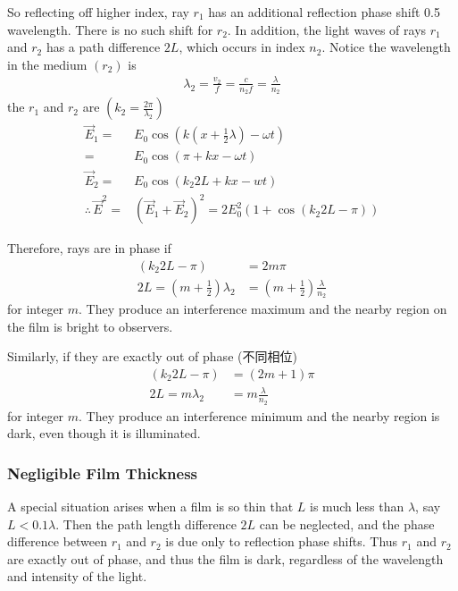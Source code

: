 So reflecting off higher index, ray $r_1$ has an additional reflection phase shift 0.5 wavelength. There is no such shift for $r_2$. In addition, the light waves of rays $r_1$ and $r_2$ has a path difference $2L$, which occurs in index $n_2$. Notice the wavelength in the medium $(r_2)$ is 
\begin{align*}
    \lambda_2 =\frac{v_2}{f}=\frac{c}{n_2 f}=\frac{\lambda}{n_2}
\end{align*}
the $r_1$ and $r_2$ are $(k_2=\frac{2\pi}{\lambda_2})$
\begin{align*}
    \vec{E}_1=&E_0\cos\left(k\left(x+\frac{1}{2}\lambda\right)-\omega t\right)\\
    =&E_0\cos(\pi+kx-\omega t)\\
    \vec{E}_2=&E_0\cos(k_2 2L+kx-wt)\\
    \therefore \, \vec{E}^2 =&\left( \vec{E}_1+\vec{E}_2 \right)^2=2E_0^2\left(1+\cos(k_2 2L-\pi) \right)
\end{align*}

Therefore, rays are in phase if 
\begin{align*}
    (k_2 2L-\pi)&=2m\pi\\
    2L=\left(m+\frac{1}{2}\right)\lambda_2&=\left(m+\frac{1}{2}\right)\frac{\lambda}{n_2}
\end{align*}
for integer $m$. They produce an interference maximum and the nearby region on the film is bright to observers. 

Similarly, if they are exactly out of phase (不同相位)
\begin{align*}
    (k_2 2L-\pi)&=(2m+1)\pi\\
    2L=m\lambda_2&=m\frac{\lambda}{n_2}
\end{align*}
for integer $m$. They produce an interference minimum and the nearby region is dark, even though it is illuminated. 

\subsubsection{Negligible Film Thickness}
A special situation arises when a film is so thin that $L$ is much less than $\lambda$, say $L<0.1\lambda$. Then the path length difference $2L$ can be neglected, and the phase difference between $r_1$ and $r_2$ is due only to reflection phase shifts. Thus $r_1$ and $r_2$ are exactly out of phase, and thus the film is dark, regardless of the wavelength and intensity of the light. 